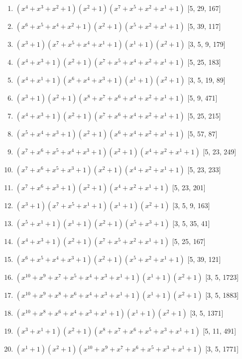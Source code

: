 \documentclass[10pt,twocolumn]{article}
\begin{document}
\begin{enumerate}
\item $(x^{4} + x^{3} + x^{2} + 1)(x^{2} + 1)(x^{7} + x^{5} + x^{2} + x^{1} + 1)$  [5, 29, 167]
\item $(x^{6} + x^{5} + x^{4} + x^{2} + 1)(x^{2} + 1)(x^{5} + x^{2} + x^{1} + 1)$  [5, 39, 117]
\item $(x^{3} + 1)(x^{7} + x^{5} + x^{4} + x^{1} + 1)(x^{1} + 1)(x^{2} + 1)$  [3, 5, 9, 179]
\item $(x^{4} + x^{3} + 1)(x^{2} + 1)(x^{7} + x^{5} + x^{4} + x^{2} + x^{1} + 1)$  [5, 25, 183]
\item $(x^{4} + x^{1} + 1)(x^{6} + x^{4} + x^{3} + 1)(x^{1} + 1)(x^{2} + 1)$  [3, 5, 19, 89]
\item $(x^{3} + 1)(x^{2} + 1)(x^{8} + x^{7} + x^{6} + x^{4} + x^{2} + x^{1} + 1)$  [5, 9, 471]
\item $(x^{4} + x^{3} + 1)(x^{2} + 1)(x^{7} + x^{6} + x^{4} + x^{2} + x^{1} + 1)$  [5, 25, 215]
\item $(x^{5} + x^{4} + x^{3} + 1)(x^{2} + 1)(x^{6} + x^{4} + x^{2} + x^{1} + 1)$  [5, 57, 87]
\item $(x^{7} + x^{6} + x^{5} + x^{4} + x^{3} + 1)(x^{2} + 1)(x^{4} + x^{2} + x^{1} + 1)$  [5, 23, 249]
\item $(x^{7} + x^{6} + x^{5} + x^{3} + 1)(x^{2} + 1)(x^{4} + x^{2} + x^{1} + 1)$  [5, 23, 233]
\item $(x^{7} + x^{6} + x^{3} + 1)(x^{2} + 1)(x^{4} + x^{2} + x^{1} + 1)$  [5, 23, 201]
\item $(x^{3} + 1)(x^{7} + x^{5} + x^{1} + 1)(x^{1} + 1)(x^{2} + 1)$  [3, 5, 9, 163]
\item $(x^{5} + x^{1} + 1)(x^{1} + 1)(x^{2} + 1)(x^{5} + x^{3} + 1)$  [3, 5, 35, 41]
\item $(x^{4} + x^{3} + 1)(x^{2} + 1)(x^{7} + x^{5} + x^{2} + x^{1} + 1)$  [5, 25, 167]
\item $(x^{6} + x^{5} + x^{4} + x^{3} + 1)(x^{2} + 1)(x^{5} + x^{2} + x^{1} + 1)$  [5, 39, 121]
\item $(x^{10} + x^{9} + x^{7} + x^{5} + x^{4} + x^{3} + x^{1} + 1)(x^{1} + 1)(x^{2} + 1)$  [3, 5, 1723]
\item $(x^{10} + x^{9} + x^{8} + x^{6} + x^{4} + x^{3} + x^{1} + 1)(x^{1} + 1)(x^{2} + 1)$  [3, 5, 1883]
\item $(x^{10} + x^{8} + x^{6} + x^{4} + x^{3} + x^{1} + 1)(x^{1} + 1)(x^{2} + 1)$  [3, 5, 1371]
\item $(x^{3} + x^{1} + 1)(x^{2} + 1)(x^{8} + x^{7} + x^{6} + x^{5} + x^{3} + x^{1} + 1)$  [5, 11, 491]
\item $(x^{1} + 1)(x^{2} + 1)(x^{10} + x^{9} + x^{7} + x^{6} + x^{5} + x^{3} + x^{1} + 1)$  [3, 5, 1771]

\end{enumerate}
\end{document}
